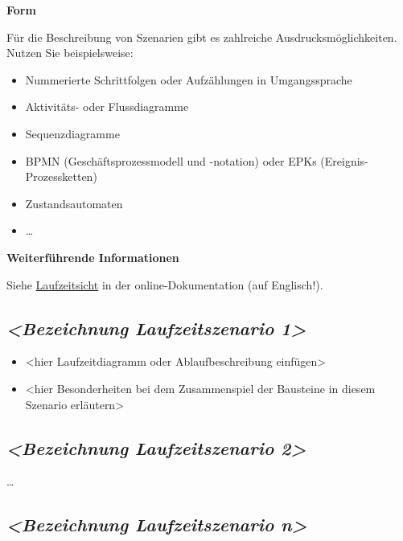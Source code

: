 \documentclass[
]{article}
\begin{document}
\textbf{Form}

Für die Beschreibung von Szenarien gibt es zahlreiche
Ausdrucksmöglichkeiten. Nutzen Sie beispielsweise:

\begin{itemize}
\item
  Nummerierte Schrittfolgen oder Aufzählungen in Umgangssprache
\item
  Aktivitäts- oder Flussdiagramme
\item
  Sequenzdiagramme
\item
  BPMN (Geschäftsprozessmodell und -notation) oder EPKs
  (Ereignis-Prozessketten)
\item
  Zustandsautomaten
\item
  \ldots\hspace{0pt}
\end{itemize}

\textbf{Weiterführende Informationen}

Siehe \href{https://docs.arc42.org/section-6/}{Laufzeitsicht} in der
online-Dokumentation (auf Englisch!).

\subsection{\texorpdfstring{\emph{\textless Bezeichnung Laufzeitszenario
1\textgreater{}}}{\textless Bezeichnung Laufzeitszenario 1\textgreater{}}}\label{_bezeichnung_laufzeitszenario_1}

\begin{itemize}
\item
  \textless hier Laufzeitdiagramm oder Ablaufbeschreibung
  einfügen\textgreater{}
\item
  \textless hier Besonderheiten bei dem Zusammenspiel der Bausteine in
  diesem Szenario erläutern\textgreater{}
\end{itemize}

\subsection{\texorpdfstring{\emph{\textless Bezeichnung Laufzeitszenario
2\textgreater{}}}{\textless Bezeichnung Laufzeitszenario 2\textgreater{}}}\label{_bezeichnung_laufzeitszenario_2}

\ldots\hspace{0pt}

\subsection{\texorpdfstring{\emph{\textless Bezeichnung Laufzeitszenario
n\textgreater{}}}{\textless Bezeichnung Laufzeitszenario n\textgreater{}}}\label{_bezeichnung_laufzeitszenario_n}
\end{document}
